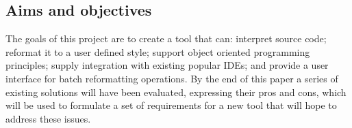 \subsection{Aims and objectives}
The goals of this project are to create a tool that can: interpret source code; reformat it to a user defined style; support object oriented programming principles; supply integration with existing popular IDEs; and provide a user interface for batch reformatting operations. By the end of this paper a series of existing solutions will have been evaluated, expressing their pros and cons, which will be used to formulate a set of requirements for a new tool that will hope to address these issues.
